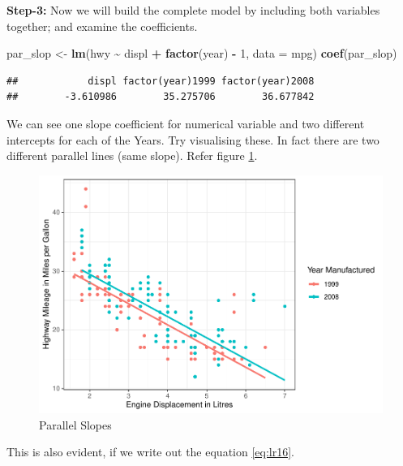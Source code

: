 \documentclass[
]{book}
\newenvironment{Shaded}{\begin{snugshade}}{\end{snugshade}}
\newcommand{\AttributeTok}[1]{\textcolor[rgb]{0.13,0.29,0.53}{#1}}
\newcommand{\DecValTok}[1]{\textcolor[rgb]{0.00,0.00,0.81}{#1}}
\newcommand{\FunctionTok}[1]{\textcolor[rgb]{0.13,0.29,0.53}{\textbf{#1}}}
\newcommand{\NormalTok}[1]{#1}
\newcommand{\OtherTok}[1]{\textcolor[rgb]{0.56,0.35,0.01}{#1}}
\newcommand{\SpecialCharTok}[1]{\textcolor[rgb]{0.81,0.36,0.00}{\textbf{#1}}}
\begin{document}
\textbf{Step-3:} Now we will build the complete model by including both variables together; and examine the coefficients.

\begin{Shaded}
\begin{Highlighting}[]
\NormalTok{par\_slop }\OtherTok{\textless{}{-}} \FunctionTok{lm}\NormalTok{(hwy }\SpecialCharTok{\textasciitilde{}}\NormalTok{ displ }\SpecialCharTok{+} \FunctionTok{factor}\NormalTok{(year) }\SpecialCharTok{{-}} \DecValTok{1}\NormalTok{, }\AttributeTok{data =}\NormalTok{ mpg)}
\FunctionTok{coef}\NormalTok{(par\_slop)}
\end{Highlighting}
\end{Shaded}

\begin{verbatim}
##            displ factor(year)1999 factor(year)2008 
##        -3.610986        35.275706        36.677842
\end{verbatim}

We can see one slope coefficient for numerical variable and two different intercepts for each of the Years. Try visualising these. In fact there are two different parallel lines (same slope). Refer figure \ref{fig:parrslop2}.

\begin{figure}

{\centering \includegraphics[width=0.95\linewidth,height=0.35\textheight]{DauR_files/figure-latex/parrslop2-1} 

}

\caption{Parallel Slopes}\label{fig:parrslop2}
\end{figure}

This is also evident, if we write out the equation \eqref{eq:lr16}.
\end{document}

